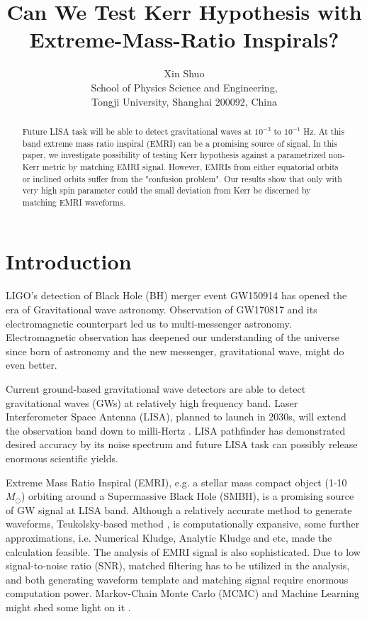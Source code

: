 \documentclass{article}
\begin{document}
\title{Can We Test Kerr Hypothesis with Extreme-Mass-Ratio Inspirals?}
\author{Xin Shuo\\School of Physics Science and Engineering,\\Tongji University, Shanghai 200092, China}
\date{}
\maketitle
\begin{abstract}
	Future LISA task will be able to detect gravitational waves at $10^{-3}$ to $10^{-1}$ Hz. At this band extreme mass ratio inspiral (EMRI) can be a promising source of signal. In this paper, we investigate possibility of testing Kerr hypothesis against a parametrized non-Kerr metric by matching EMRI signal. However, EMRIs from either equatorial orbits or inclined orbits suffer from the "confusion problem". Our results show that only with very high spin parameter could the small deviation from Kerr be discerned by matching EMRI waveforms.
\end{abstract}


\section{Introduction}

LIGO's detection of Black Hole (BH) merger event GW150914 has opened the era of Gravitational wave astronomy\cite{ligo}. Observation of  GW170817 \cite{170817}and its electromagnetic counterpart led us to multi-messenger astronomy. Electromagnetic observation has deepened our understanding of the universe since born of astronomy and the new messenger, gravitational wave, might do even better. 

Current ground-based gravitational wave detectors are able to detect gravitational waves (GWs) at relatively high frequency band. Laser Interferometer Space Antenna (LISA), planned to launch in 2030s, will extend the observation band down to milli-Hertz \cite{lisa}. LISA pathfinder has demonstrated desired accuracy by its noise spectrum and future LISA task can possibly release enormous scientific yields. 

Extreme Mass Ratio Inspiral (EMRI), e.g. a stellar mass compact object (1-10 $M_{\odot}$) orbiting around a Supermassive Black Hole (SMBH), is a promising source of GW signal at LISA band. %
Although a relatively accurate method to generate waveforms, Teukolsky-based method \cite{TB}\cite{review_waveform}, is computationally expansive, some further approximations, i.e. Numerical Kludge\cite{kludge}, Analytic Kludge\cite{AK} and etc, made the calculation feasible. The analysis of EMRI signal is also sophisticated. Due to low signal-to-noise ratio (SNR), matched filtering has to be utilized in the analysis, and both generating waveform template and matching signal require enormous computation power. Markov-Chain Monte Carlo (MCMC) and Machine Learning might shed some light on it \cite{MCMC} \cite{machine_learning}.
\end{document}
